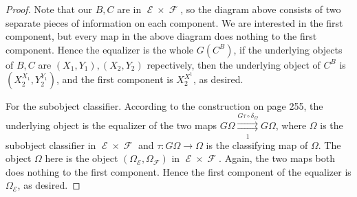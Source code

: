 \documentclass[a4paper]{article}
\DeclareMathOperator{\E}{\mathcal E}
\DeclareMathOperator{\F}{\mathcal F}
\begin{document}
\begin{proof}
    Note that our $B,C$ are in $\E\times \F$, so the diagram above consists of two separate pieces of information on each component. We are interested in the first component, but every map in the above diagram does nothing to the first component. Hence the equalizer is the whole $G(C^B)$, if the underlying objects of $B,C$ are $(X_1,Y_1),(X_2,Y_2)$ repectively, then the underlying object of $C^B$ is $(X_2^{X_1},Y_2^{Y_1})$, and the first component is $X_2^{X^1}$, as desired.

    For the subobject classifier. According to the construction on page 255, the underlying object is the equalizer of the two maps $G\Omega\overset{G\tau\circ \delta_{\Omega}}{\underset{1}\rightrightarrows} G\Omega$, where $\Omega$ is the subobject classifier in $\E\times \F$ and $\tau:G\Omega\to \Omega$ is the classifying map of $\Omega$. The object $\Omega$ here is the object $(\Omega_{\E},\Omega_{\F})$ in $\E\times \F$. Again, the two maps both does nothing to the first component. Hence the first component of the equalizer is $\Omega_{\E}$, as desired.

\end{proof}
\end{document}
